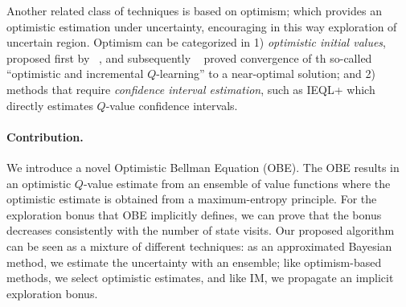 Another related class of techniques is based on optimism; which provides an optimistic estimation under uncertainty, encouraging in this way exploration of uncertain region. Optimism can be categorized in 1) \textsl{optimistic
	initial values}, proposed first by \citeauthor{sutton1998reinforcement}~,
and subsequently \citeauthor{even2002convergence}~ proved convergence of th so-called ``optimistic and incremental
$Q$-learning'' to a 
near-optimal solution; and 2) methods that require \textsl{confidence
	interval estimation}, such as IEQL+ \cite{meuleau1999exploration}
which directly estimates $Q$-value confidence intervals.



\paragraph{Contribution.} We introduce a novel Optimistic
Bellman Equation (OBE). The OBE results in an optimistic $Q$-value estimate
from an ensemble of value functions where the optimistic estimate is obtained from a maximum-entropy principle. For the exploration bonus that OBE implicitly defines,
we can prove that the bonus decreases consistently with the number of
state visits. Our proposed algorithm can be seen as a mixture of
different techniques: as an approximated Bayesian method, we estimate
the uncertainty with an ensemble; like optimism-based methods, we select
optimistic estimates, and like IM, we propagate an implicit
exploration bonus.

